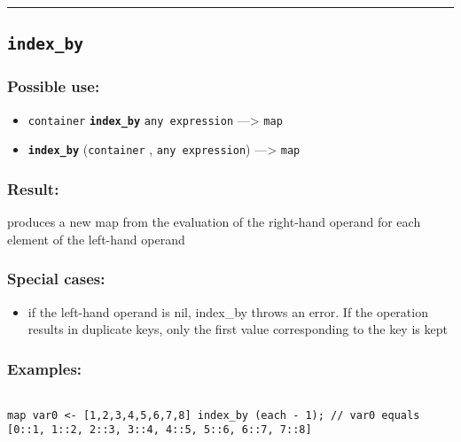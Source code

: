 \documentclass[]{book}
\providecommand{\tightlist}{%
  \setlength{\itemsep}{0pt}\setlength{\parskip}{0pt}}
\theoremstyle{definition}
\theoremstyle{definition}
\theoremstyle{definition}
\theoremstyle{remark}
\begin{document}
\begin{center}\rule{0.5\linewidth}{\linethickness}\end{center}

\subsection{\texorpdfstring{\texttt{index\_by}}{index\_by}}\label{index_by}

\subsubsection{Possible use:}\label{possible-use-273}

\begin{itemize}
\tightlist
\item
  \texttt{container} \textbf{\texttt{index\_by}}
  \texttt{any\ expression} ---\textgreater{} \texttt{map}
\item
  \textbf{\texttt{index\_by}} (\texttt{container} ,
  \texttt{any\ expression}) ---\textgreater{} \texttt{map}
\end{itemize}

\subsubsection{Result:}\label{result-263}

produces a new map from the evaluation of the right-hand operand for
each element of the left-hand operand

\subsubsection{Special cases:}\label{special-cases-78}

\begin{itemize}
\tightlist
\item
  if the left-hand operand is nil, index\_by throws an error. If the
  operation results in duplicate keys, only the first value
  corresponding to the key is kept
\end{itemize}

\subsubsection{Examples:}\label{examples-207}

\begin{verbatim}
 
map var0 <- [1,2,3,4,5,6,7,8] index_by (each - 1); // var0 equals [0::1, 1::2, 2::3, 3::4, 4::5, 5::6, 6::7, 7::8]
\end{verbatim}
\end{document}
